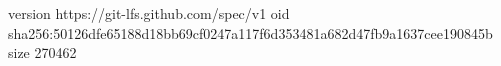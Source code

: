 version https://git-lfs.github.com/spec/v1
oid sha256:50126dfe65188d18bb69cf0247a117f6d353481a682d47fb9a1637cee190845b
size 270462
